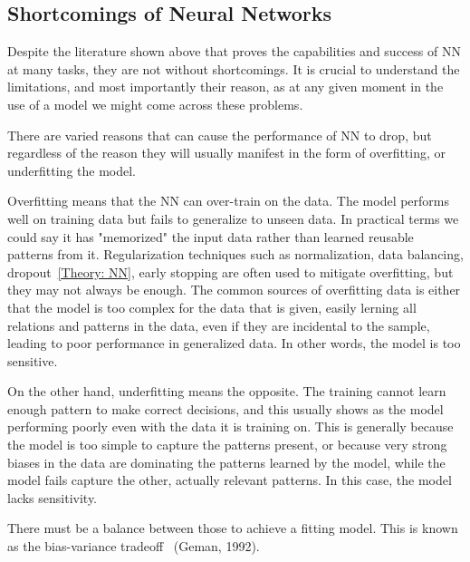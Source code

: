 \documentclass[a4paper, 11pt]{report}
\begin{document}
\subsection{Shortcomings of Neural Networks}\label{Theory: NN-shortcoming}

Despite the literature shown above that proves the capabilities and success of NN at many tasks, they are not without shortcomings. It is crucial to understand the limitations, and most importantly their reason, as at any given moment in the use of a model we might come across these problems.

There are varied reasons that can cause the performance of NN to drop, but regardless of the reason they will usually manifest in the form of overfitting, or underfitting the model.

Overfitting means that the NN can over-train on the data. The model performs well on training data but fails to generalize to unseen data. In practical terms we could say it has "memorized" the input data rather than learned reusable patterns from it. Regularization techniques such as normalization, data balancing, dropout~\ref{Theory: NN}, early stopping are often used to mitigate overfitting, but they may not always be enough. The common sources of overfitting data is either that the model is too complex for the data that is given, easily lerning all relations and patterns in the data, even if they are incidental to the sample, leading to poor performance in generalized data. In other words, the model is too sensitive.

On the other hand, underfitting means the opposite. The training cannot learn enough pattern to make correct decisions, and this usually shows as the model performing poorly even with the data it is training on. This is generally because the model is too simple to capture the patterns present, or because very strong biases in the data are dominating the patterns learned by the model, while the model fails capture the other, actually relevant patterns. In this case, the model lacks sensitivity.

There must be a balance between those to achieve a fitting model. This is known as the bias-variance tradeoff~\cite{Geman1992_Bias_Variance} (Geman, 1992).
\end{document}
